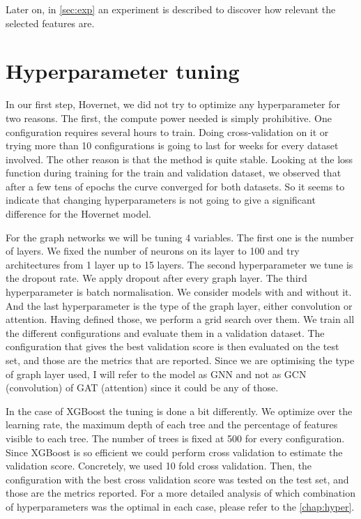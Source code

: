 \noindent Later on, in \autoref{sec:exp} an experiment is described to discover how relevant the selected features are.

\section{Hyperparameter tuning}\label{sec:hyper}

In our first step, Hovernet, we did not try to optimize any hyperparameter for two reasons. The first, the compute power needed is simply prohibitive. One configuration requires several hours to train. Doing cross-validation on it or trying more than 10 configurations is going to last for weeks for every dataset involved. The other reason is that the method is quite stable. Looking at the loss function during training for the train and validation dataset, we observed that after a few tens of epochs the curve converged for both datasets. So it seems to indicate that changing hyperparameters is not going to give a significant difference for the Hovernet model.

For the graph networks we will be  tuning 4 variables. The first one is the number of layers. We fixed the number of neurons on its layer to 100 and try architectures from 1 layer up to 15 layers. The second hyperparameter we tune is the dropout rate. We apply dropout after every graph layer. The third hyperparameter is batch normalisation. We consider models with and without it. And the last hyperparameter is the type of the graph layer, either convolution or attention. Having defined those, we perform a grid search over them. We train all the different configurations and evaluate them in a validation dataset. The configuration that gives the best validation score is then evaluated on the test set, and those are the metrics that are reported. Since we are optimising the type of graph layer used, I will refer to the model as GNN and not as GCN (convolution) of GAT (attention) since it could be any of those.

In the case of XGBoost the tuning is done a bit differently. We optimize over the learning rate, the maximum depth of each tree and the percentage of features visible to each tree. The number of trees is fixed at 500 for every configuration. Since XGBoost is so efficient we could perform cross validation to estimate the validation score. Concretely, we used 10 fold cross validation. Then, the configuration with the best cross validation score was tested on the test set, and those are the metrics reported. For a more detailed analysis of which combination of hyperparameters was the optimal in each case, please refer to the \autoref{chap:hyper}.

